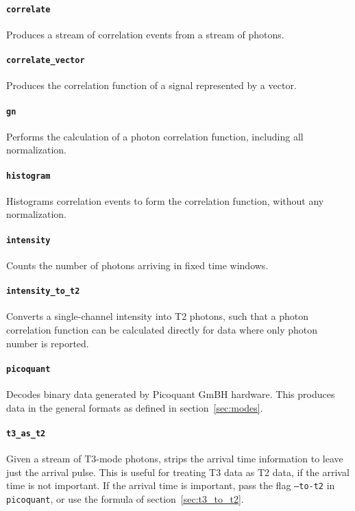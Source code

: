 \documentclass{book}
\newcommand{\program}[1]{\texttt{#1}}
\numberwithin{equation}{section}
\numberwithin{figure}{section}
\begin{document}
\paragraph{\program{correlate}}
Produces a stream of correlation events from a stream of photons.

\paragraph{\program{correlate\_vector}}
Produces the correlation function of a signal represented by a vector.

\paragraph{\program{gn}}
Performs the calculation of a photon correlation function, including all normalization.

\paragraph{\program{histogram}}
Histograms correlation events to form the correlation function, without any normalization.

\paragraph{\program{intensity}}
Counts the number of photons arriving in fixed time windows.

\paragraph{\program{intensity\_to\_t2}}
Converts a single-channel intensity into T2 photons, such that a photon correlation function can be calculated directly for data where only photon number is reported.

\paragraph{\program{picoquant}}
Decodes binary data generated by Picoquant GmBH hardware. This produces data in the general formats as defined in section~\ref{sec:modes}.

\paragraph{\program{t3\_as\_t2}}
Given a stream of T3-mode photons, strips the arrival time information to leave just the arrival pulse. This is useful for treating T3 data as T2 data, if the arrival time is not important. If the arrival time is important, pass the flag \texttt{--to-t2} in \program{picoquant}, or use the formula of section~\ref{sec:t3_to_t2}.







\end{document}
